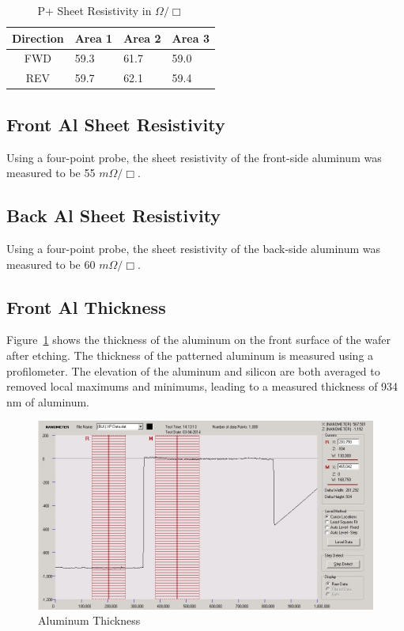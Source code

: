 \documentclass[letter,12pt]{article}
\begin{document}
		\begin{table}[h!]
			\centering
			\begin{tabular}{c || l | l | l }
				Direction	& Area 1	& Area 2	& Area 3	\\
				\hline
				FWD			& 59.3		& 61.7		& 59.0		\\
				\hline
				REV			& 59.7		& 62.1		& 59.4		\\
				\hline
			\end{tabular}
			\caption{P+ Sheet Resistivity in $\Omega/\Box$}
			\label{tab:P+_Sheet_Resistivity_2}
		\end{table}
		
	\FloatBarrier
	\subsection{Front Al Sheet Resistivity}
		Using a four-point probe, the sheet resistivity of the front-side aluminum was measured to be 55 $m\Omega/\Box$.
	
	\subsection{Back Al Sheet Resistivity}
		Using a four-point probe, the sheet resistivity of the back-side aluminum was measured to be 60 $m\Omega/\Box$. 
	
	\subsection{Front Al Thickness}
		Figure~\ref{fig:Al_Thickness} shows the thickness of the aluminum on the front surface of the wafer after etching. The thickness of the patterned aluminum is measured using a profilometer. The elevation of the aluminum and silicon are both averaged to removed local maximums and minimums, leading to a measured thickness of 934 nm of aluminum.
		
		\begin{figure}[h!]
			\centering
			\includegraphics[width=.9\textwidth]{./Images/Harkness_Step.jpg}
			\caption{Aluminum Thickness}
			\label{fig:Al_Thickness}
		\end{figure}
\end{document}
